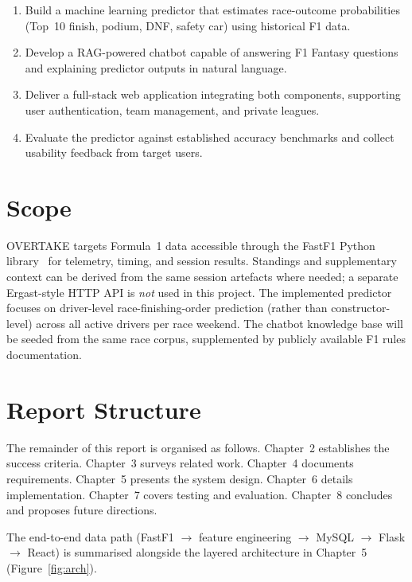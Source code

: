 \documentclass[12pt, a4paper, oneside]{report}
\begin{document}
\begin{enumerate}[leftmargin=*]
  \item Build a machine learning predictor that estimates race-outcome
        probabilities (Top~10 finish, podium, DNF, safety car) using historical
        F1 data.
  \item Develop a RAG-powered chatbot capable of answering F1 Fantasy questions
        and explaining predictor outputs in natural language.
  \item Deliver a full-stack web application integrating both components,
        supporting user authentication, team management, and private leagues.
  \item Evaluate the predictor against established accuracy benchmarks and
        collect usability feedback from target users.
\end{enumerate}

\section{Scope}

OVERTAKE targets Formula~1 data accessible through the FastF1 Python
library~\cite{fastF1} for telemetry, timing, and session results. Standings
and supplementary context can be derived from the same session artefacts where
needed; a separate Ergast-style HTTP API is \emph{not} used in this project.
The implemented predictor focuses on driver-level race-finishing-order prediction (rather than constructor-level) across all active drivers per race weekend. The
chatbot knowledge base will be seeded from the same race corpus, supplemented
by publicly available F1 rules documentation.

\section{Report Structure}

The remainder of this report is organised as follows. Chapter~2 establishes
the success criteria. Chapter~3 surveys related work. Chapter~4 documents
requirements. Chapter~5 presents the system design. Chapter~6 details
implementation. Chapter~7 covers testing and evaluation. Chapter~8 concludes
and proposes future directions.

The end-to-end data path (FastF1 $\rightarrow$ feature engineering $\rightarrow$
MySQL $\rightarrow$ Flask $\rightarrow$ React) is summarised alongside the
layered architecture in Chapter~5 (Figure~\ref{fig:arch}).
\end{document}
